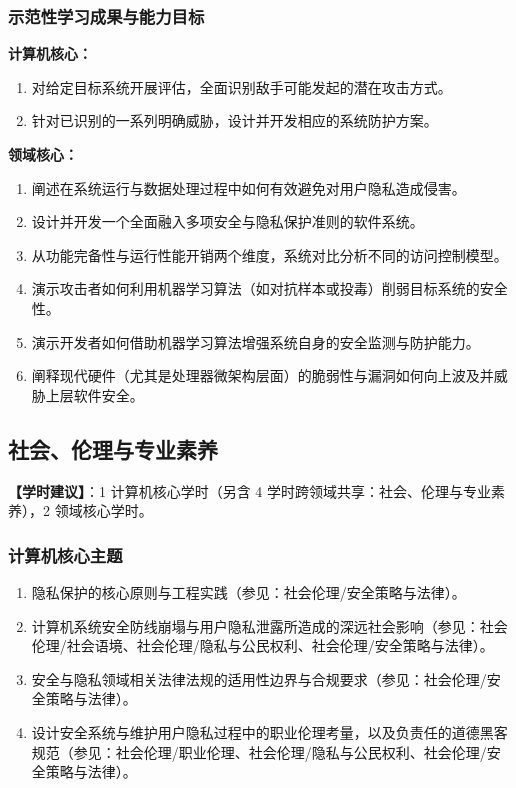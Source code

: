 \subsubsection{示范性学习成果与能力目标}
\textbf{计算机核心：}
\begin{enumerate}\setlength{\itemsep}{0pt}\setlength{\parskip}{0pt}
    \item 对给定目标系统开展评估，全面识别敌手可能发起的潜在攻击方式。
    \item 针对已识别的一系列明确威胁，设计并开发相应的系统防护方案。
\end{enumerate}
\textbf{领域核心：}
\begin{enumerate}\setlength{\itemsep}{0pt}\setlength{\parskip}{0pt}\setcounter{enumi}{2}
    \item 阐述在系统运行与数据处理过程中如何有效避免对用户隐私造成侵害。
    \item 设计并开发一个全面融入多项安全与隐私保护准则的软件系统。
    \item 从功能完备性与运行性能开销两个维度，系统对比分析不同的访问控制模型。
    \item 演示攻击者如何利用机器学习算法（如对抗样本或投毒）削弱目标系统的安全性。
    \item 演示开发者如何借助机器学习算法增强系统自身的安全监测与防护能力。
    \item 阐释现代硬件（尤其是处理器微架构层面）的脆弱性与漏洞如何向上波及并威胁上层软件安全。
\end{enumerate}

\subsection{社会、伦理与专业素养}
\textbf{【学时建议】}：1 计算机核心学时（另含 4 学时跨领域共享：社会、伦理与专业素养），2 领域核心学时。

\subsubsection{计算机核心主题}
\begin{enumerate}\setlength{\itemsep}{0pt}\setlength{\parskip}{0pt}
    \item 隐私保护的核心原则与工程实践（参见：社会伦理/安全策略与法律）。
    \item 计算机系统安全防线崩塌与用户隐私泄露所造成的深远社会影响（参见：社会伦理/社会语境、社会伦理/隐私与公民权利、社会伦理/安全策略与法律）。
    \item 安全与隐私领域相关法律法规的适用性边界与合规要求（参见：社会伦理/安全策略与法律）。
    \item 设计安全系统与维护用户隐私过程中的职业伦理考量，以及负责任的道德黑客规范（参见：社会伦理/职业伦理、社会伦理/隐私与公民权利、社会伦理/安全策略与法律）。
\end{enumerate}

